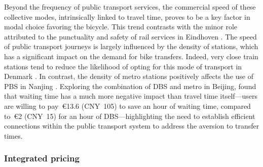 \begin{refsegment}
Beyond the frequency of public transport services, the commercial speed of these collective modes, intrinsically linked to travel time, proves to be a key factor in modal choice favoring the bicycle. This trend contrasts with the minor role attributed to the punctuality and safety of rail services in Eindhoven \textcolor{blue}{\autocite[727]{waerden_relation_2018}}. The speed of public transport journeys is largely influenced by the density of stations, which has a significant impact on the demand for bike transfers. Indeed, very close train stations tend to reduce the likelihood of opting for this mode of transport in Denmark \textcolor{blue}{\autocite[41]{nielsen_bikeability_2018}}. In contrast, the density of metro stations positively affects the use of \acrshort{PBS} in Nanjing \textcolor{blue}{\autocite[17]{ji_exploring_2018}}. Exploring the combination of \acrshort{DBS} and metro in Beijing, \textcolor{blue}{\textcite[10]{guo_exploring_2023}} found that waiting time has a much more negative impact than travel time itself—users are willing to pay~\euro13.6 (CNY~105) to save an hour of waiting time, compared to~\euro2 (CNY~15) for an hour of \acrshort{DBS}—highlighting the need to establish efficient connections within the public transport system to address the aversion to transfer times.%

\subsubsection*{Integrated pricing
    \label{chap2:tarification_integree}
    }


\end{refsegment}
